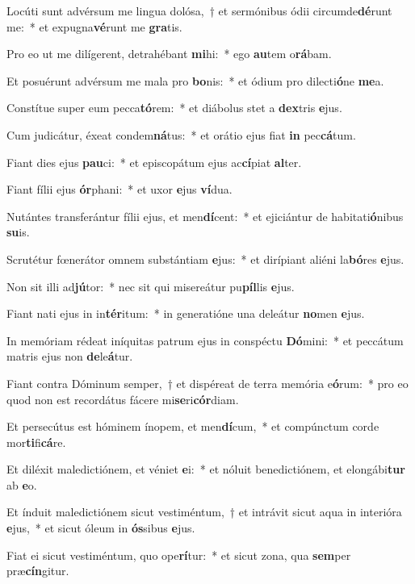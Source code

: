 \item Locúti sunt advérsum me lingua dolósa,~† et sermónibus ódii circumde\textbf{dé}runt me:~* et expugna\textbf{vé}runt me \textbf{gra}tis.
\item Pro eo ut me dilígerent, detrahébant \textbf{mi}hi:~* ego \textbf{au}tem o\textbf{rá}bam.
\item Et posuérunt advérsum me mala pro \textbf{bo}nis:~* et ódium pro dilecti\textbf{ó}ne \textbf{me}a.
\item Constítue super eum pecca\textbf{tó}rem:~* et diábolus stet a \textbf{dex}tris \textbf{e}jus.
\item Cum judicátur, éxeat condem\textbf{ná}tus:~* et orátio ejus fiat \textbf{in} pec\textbf{cá}tum.
\item Fiant dies ejus \textbf{pau}ci:~* et episcopátum ejus ac\textbf{cí}piat \textbf{al}ter.
\item Fiant fílii ejus \textbf{ór}phani:~* et uxor \textbf{e}jus \textbf{ví}dua.
\item Nutántes transferántur fílii ejus, et men\textbf{dí}cent:~* et ejiciántur de habitati\textbf{ó}nibus \textbf{su}is.
\item Scrutétur fœnerátor omnem substántiam \textbf{e}jus:~* et dirípiant aliéni la\textbf{bó}res \textbf{e}jus.
\item Non sit illi ad\textbf{jú}tor:~* nec sit qui misereátur pu\textbf{píl}lis \textbf{e}jus.
\item Fiant nati ejus in in\textbf{tér}itum:~* in generatióne una deleátur \textbf{no}men \textbf{e}jus.
\item In memóriam rédeat iníquitas patrum ejus in conspéctu \textbf{Dó}mini:~* et peccátum matris ejus non \textbf{de}le\textbf{á}tur.
\item Fiant contra Dóminum semper,~† et dispéreat de terra memória e\textbf{ó}rum:~* pro eo quod non est recordátus fácere mi\textbf{se}ri\textbf{cór}diam.
\item Et persecútus est hóminem ínopem, et men\textbf{dí}cum,~* et compúnctum corde mor\textbf{ti}fi\textbf{cá}re.
\item Et diléxit maledictiónem, et véniet \textbf{e}i:~* et nóluit benedictiónem, et elongábi\textbf{tur} ab \textbf{e}o.
\item Et índuit maledictiónem sicut vestiméntum,~† et intrávit sicut aqua in interióra \textbf{e}jus,~* et sicut óleum in \textbf{ós}sibus \textbf{e}jus.
\item Fiat ei sicut vestiméntum, quo ope\textbf{rí}tur:~* et sicut zona, qua \textbf{sem}per præ\textbf{cín}gitur.
